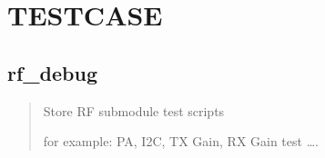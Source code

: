 \documentclass[letterpaper,10pt,english]{sphinxhowto}
\begin{document}
\begin{fulllineitems}

\begin{fulllineitems}
\label{\detokenize{rflib/index:adc_dump.DUMP.get_dump_data}}
\end{fulllineitems}


\begin{fulllineitems}
\label{\detokenize{rflib/index:adc_dump.DUMP.sampledeal}}
\end{fulllineitems}


\begin{fulllineitems}
\label{\detokenize{rflib/index:adc_dump.DUMP.set_dump_mode}}
\end{fulllineitems}


\begin{fulllineitems}
\label{\detokenize{rflib/index:adc_dump.DUMP.write_dump_data}}
\end{fulllineitems}


\end{fulllineitems}



\section{TESTCASE}
\label{\detokenize{testcase/index:testcase}}\label{\detokenize{testcase/index::doc}}

\subsection{rf\_debug}
\label{\detokenize{testcase/index:rf-debug}}\begin{quote}

Store RF submodule test scripts

for example: PA, I2C, TX Gain, RX Gain test ….
\end{quote}
\end{document}

